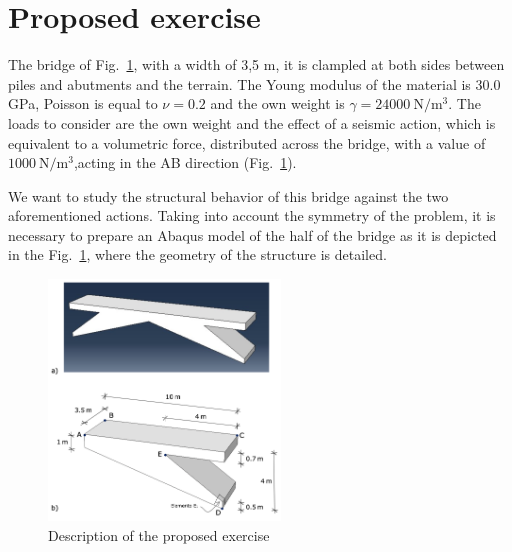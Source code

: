 \documentclass[english,a4paper,12pt]{article}
\begin{document}
{}
\mbox{}


\clearpage
\section{Proposed exercise}

The bridge of Fig.~\ref{figuprop1}, with a width of 3,5 m, it is clampled at both sides between piles and abutments and the terrain. The Young  modulus of the material is 30.0 GPa, Poisson is equal to $\nu=0.2$ and the own weight is $\gamma=24000 \mathrm{~N} / \mathrm{m}^{3}$. The loads to consider are the own weight and the effect of a seismic action, which is equivalent to a volumetric force, distributed across the bridge, with a value of $1000 \mathrm{~N} / \mathrm{m}^{3}$,acting in the AB direction (Fig.~\ref{figuprop1}).


We want to study the structural behavior of this bridge against the two aforementioned actions. Taking into account the symmetry of the problem, it is necessary to prepare an Abaqus model of the half of the bridge as it is depicted in the Fig.~\ref{figuprop1}, where the geometry of the structure is detailed.

\begin{figure}[!h]
  \begin{center}
    \includegraphics[width=0.55\textwidth]{./figs/prop}
  \end{center}
  \caption{Description of the proposed exercise}
  \label{figuprop1}
\end{figure}
\end{document}
